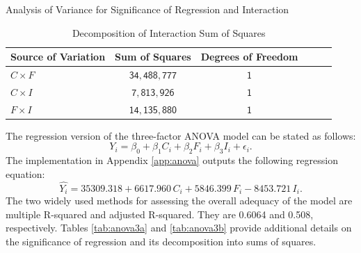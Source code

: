 \documentclass[11pt]{article}
\begin{document}
\begin{table}[h!]
\centering
\caption{Analysis of Variance for Significance of Regression and Interaction} 
\label{tab:anova2a}

\caption{Decomposition of Interaction Sum of Squares} 
\label{tab:anova2b}
\begin{tabular}{lccccc}
\toprule
\textbf{Source of Variation} & \textbf{Sum of Squares} & \textbf{Degrees of Freedom} \\ 
\midrule
$C\times F$ & $\mathsf{34,488,777}$ & $\mathsf{1}$ \\
$C\times I$ & $\mathsf{7,813,926}$ & $\mathsf{1}$ \\
$F\times I$ & $\mathsf{14,135,880}$ & $\mathsf{1}$ \\
\bottomrule
\end{tabular}
\end{table}

The regression version of the three-factor ANOVA model can be stated as follows:
\begin{equation}\label{eq:model}
Y_i=\beta_{0}+\beta_{1}C_{i}+\beta_{2}F_{i}+\beta_{3}I_{i}+\epsilon_{i}.
\end{equation}
The implementation in Appendix \ref{app:anova} outputs the following regression equation:
\begin{equation}\label{eq:reg}
\hat{Y_i}=35309.318+6617.960\,C_{i}+5846.399\,F_{i}-8453.721\,I_{i}.
\end{equation}
The two widely used methods for assessing the overall adequacy of the model are multiple R-squared and adjusted R-squared. They are 0.6064 and 0.508, respectively. Tables \ref{tab:anova3a} and \ref{tab:anova3b} provide additional details on the significance of regression and its decomposition into sums of squares.
\end{document}
